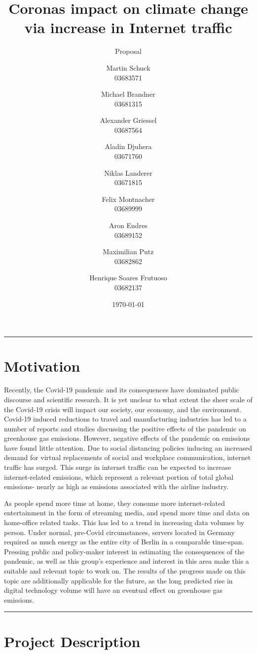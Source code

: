 \documentclass[s=english,inputenc=utf8,fontsize=10pt]{ldvarticle}
\title{Coronas impact on climate change via increase in Internet traffic}
\subtitle{Proposal}
\author{Martin Schuck\\
03683571
\and
Michael Brandner\\
03681315
\and
Alexander Griessel\\
03687564
\and
Aladin Djuhera\\
03671760
\and
Niklas Landerer\\
03671815
\and
Felix Montnacher\\
03689999
\and
Aron Endres\\
03689152
\and
Maximilian Putz\\
03682862
\and
Henrique Soares Frutuoso\\
03682137
}
\date{\today}
\begin{document}
\maketitle
\thispagestyle{empty}

\hrule
\setlength{\parskip}{0cm}
\section*{Motivation}

Recently, the Covid-19 pandemic and its consequences have dominated public discourse and scientific research. It is yet unclear to what extent the sheer scale of the Covid-19 crisis will impact our society, our economy, and the environment. Covid-19 induced reductions to travel and manufacturing industries has led to a number of reports and studies discussing the positive effects of the pandemic on greenhouse gas emissions. However, negative effects of the pandemic on emissions have found little attention. Due to social distancing policies inducing an increased demand for virtual replacements of social and workplace communication, internet traffic has surged. This surge in internet traffic can be expected to increase internet-related emissions, which represent a relevant portion of total global emissions- nearly as high as emissions associated with the airline industry. 

As people spend more time at home, they consume more internet-related entertainment in the form of streaming media, and spend more time and data on home-office related tasks. This has led to a trend in increasing data volumes by person. Under normal, pre-Covid circumstances, servers located in Germany required as much energy as the entire city of Berlin in a comparable time-span. Pressing public and policy-maker interest in estimating the consequences of the pandemic, as well as this group’s experience and interest in this area make this a suitable and relevant topic to work on. The results of the progress made on this topic are additionally applicable for the future, as the long predicted rise in digital technology volume will have an eventual effect on greenhouse gas emissions.

\vspace*{0.5cm}
\hrule

\newpage

\section{Project Description}
\end{document}
